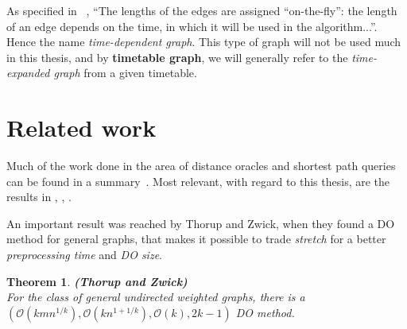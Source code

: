 \documentclass[a4paper]{article}
\newtheorem{theorem}{Theorem}
\begin{document}
        \noindent As specified in ~\cite{timetablemodelsalgs07}, ``The lengths of the edges are assigned ``on-the-fly'': the length of an edge depends on the time, in which it will be used in the algorithm...''. Hence the name \emph{time-dependent graph}. This type of graph will not be used much in this thesis, and by \textbf{timetable graph}, we will generally refer to the \emph{time-expanded graph} from a given timetable.







    \pagebreak


    \section{Related work}
    Much of the work done in the area of distance oracles and shortest path queries can be found in a summary~\cite{hajnresearch12}. Most relevant, with regard to this thesis, are the results in \cite{apxdo05}, \cite{highwaydim10}, \cite{distlabel04}.

    An important result was reached by Thorup and Zwick, when they found a DO method for general graphs, that makes it possible to trade \emph{stretch} for a better \emph{preprocessing time} and \emph{DO size}.

    \begin{theorem}
        \textbf{(Thorup and Zwick)} \\
        For the class of general undirected weighted graphs, there is a $(\mathcal{O}(kmn^{1/k}), \mathcal{O}(kn^{1 + 1/k}), \mathcal{O}(k), 2k - 1)$ DO method.
    \end{theorem}



\end{document}
